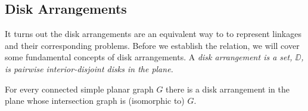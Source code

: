 \subsection{Disk Arrangements}
It turns out the disk arrangements are an equivalent way to to represent linkages and their corresponding problems.  Before we establish the relation, we will cover some fundamental concepts of disk arrangements.  
A \it{disk arrangement} is a set, $\DD$, is pairwise interior-disjoint disks in the plane.
\begin{thm}\label{thm2-1}
For every connected simple planar graph $G$ there is a disk arrangement in the
plane whose intersection graph is (isomorphic to) $G$.
\end{thm}

